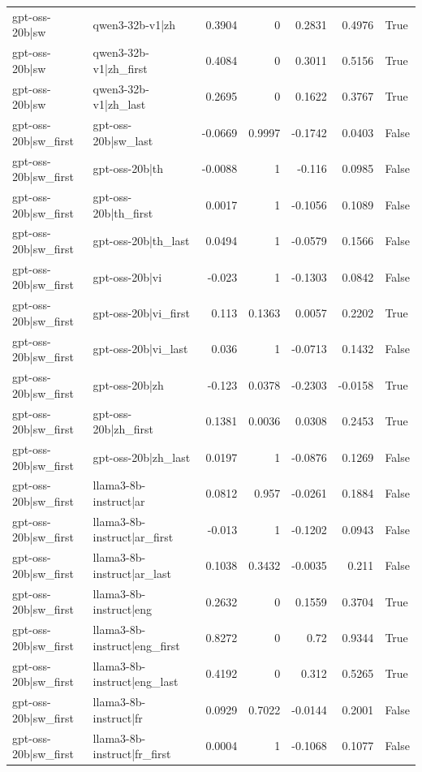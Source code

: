\begin{table}
\begin{tabular}{l l r r r r l}
gpt-oss-20b|sw & qwen3-32b-v1|zh & 0.3904 & 0 & 0.2831 & 0.4976 & True \\
gpt-oss-20b|sw & qwen3-32b-v1|zh_first & 0.4084 & 0 & 0.3011 & 0.5156 & True \\
gpt-oss-20b|sw & qwen3-32b-v1|zh_last & 0.2695 & 0 & 0.1622 & 0.3767 & True \\
gpt-oss-20b|sw_first & gpt-oss-20b|sw_last & -0.0669 & 0.9997 & -0.1742 & 0.0403 & False \\
gpt-oss-20b|sw_first & gpt-oss-20b|th & -0.0088 & 1 & -0.116 & 0.0985 & False \\
gpt-oss-20b|sw_first & gpt-oss-20b|th_first & 0.0017 & 1 & -0.1056 & 0.1089 & False \\
gpt-oss-20b|sw_first & gpt-oss-20b|th_last & 0.0494 & 1 & -0.0579 & 0.1566 & False \\
gpt-oss-20b|sw_first & gpt-oss-20b|vi & -0.023 & 1 & -0.1303 & 0.0842 & False \\
gpt-oss-20b|sw_first & gpt-oss-20b|vi_first & 0.113 & 0.1363 & 0.0057 & 0.2202 & True \\
gpt-oss-20b|sw_first & gpt-oss-20b|vi_last & 0.036 & 1 & -0.0713 & 0.1432 & False \\
gpt-oss-20b|sw_first & gpt-oss-20b|zh & -0.123 & 0.0378 & -0.2303 & -0.0158 & True \\
gpt-oss-20b|sw_first & gpt-oss-20b|zh_first & 0.1381 & 0.0036 & 0.0308 & 0.2453 & True \\
gpt-oss-20b|sw_first & gpt-oss-20b|zh_last & 0.0197 & 1 & -0.0876 & 0.1269 & False \\
gpt-oss-20b|sw_first & llama3-8b-instruct|ar & 0.0812 & 0.957 & -0.0261 & 0.1884 & False \\
gpt-oss-20b|sw_first & llama3-8b-instruct|ar_first & -0.013 & 1 & -0.1202 & 0.0943 & False \\
gpt-oss-20b|sw_first & llama3-8b-instruct|ar_last & 0.1038 & 0.3432 & -0.0035 & 0.211 & False \\
gpt-oss-20b|sw_first & llama3-8b-instruct|eng & 0.2632 & 0 & 0.1559 & 0.3704 & True \\
gpt-oss-20b|sw_first & llama3-8b-instruct|eng_first & 0.8272 & 0 & 0.72 & 0.9344 & True \\
gpt-oss-20b|sw_first & llama3-8b-instruct|eng_last & 0.4192 & 0 & 0.312 & 0.5265 & True \\
gpt-oss-20b|sw_first & llama3-8b-instruct|fr & 0.0929 & 0.7022 & -0.0144 & 0.2001 & False \\
gpt-oss-20b|sw_first & llama3-8b-instruct|fr_first & 0.0004 & 1 & -0.1068 & 0.1077 & False \\

\end{tabular}
\end{table}
